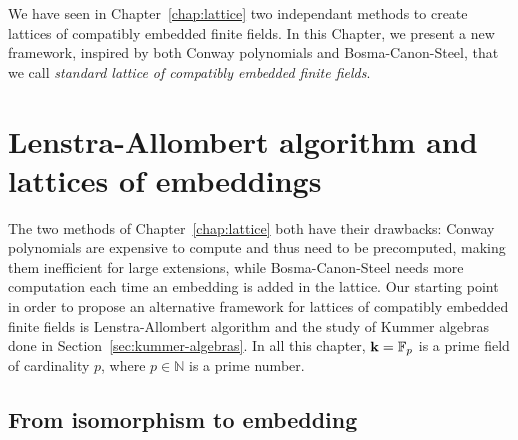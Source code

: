 We have seen in Chapter~\ref{chap:lattice} two independant methods to create
lattices of compatibly embedded finite fields. In this Chapter, we present a new
framework, inspired by both Conway polynomials and Bosma-Canon-Steel, that we
call \emph{standard lattice of compatibly embedded finite fields}.
\minitoc


\clearpage

\section{Lenstra-Allombert algorithm and lattices of embeddings}
\label{sec:lenstra-allombert-embeddings}

The two methods of Chapter~\ref{chap:lattice} both have their drawbacks: Conway
polynomials are expensive to compute and thus need to be precomputed, making
them inefficient for large extensions, while Bosma-Canon-Steel needs more
computation each time an embedding is added in the lattice. %
Our starting point in order to propose an alternative framework for lattices of
compatibly embedded finite fields is Lenstra-Allombert algorithm and the study
of Kummer algebras done in Section~\ref{sec:kummer-algebras}. In all this
chapter, $\mathbf{k}=\mathbb{F}_p$ is a prime field of cardinality $p$, where
$p\in\mathbb{N}$ is a prime number.

\subsection{From isomorphism to embedding}
\label{sec:iso-to-emb}

